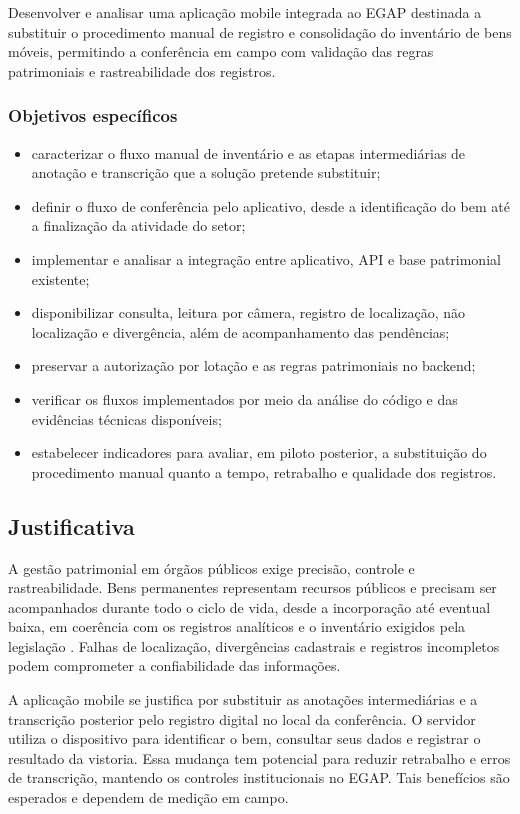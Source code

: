 \documentclass[12pt,a4paper]{article}
\begin{document}
Desenvolver e analisar uma aplicação mobile integrada ao EGAP destinada a substituir o procedimento manual de registro e consolidação do inventário de bens móveis, permitindo a conferência em campo com validação das regras patrimoniais e rastreabilidade dos registros.

\subsubsection{Objetivos específicos}

\begin{itemize}
    \item caracterizar o fluxo manual de inventário e as etapas intermediárias de anotação e transcrição que a solução pretende substituir;
    \item definir o fluxo de conferência pelo aplicativo, desde a identificação do bem até a finalização da atividade do setor;
    \item implementar e analisar a integração entre aplicativo, API e base patrimonial existente;
    \item disponibilizar consulta, leitura por câmera, registro de localização, não localização e divergência, além de acompanhamento das pendências;
    \item preservar a autorização por lotação e as regras patrimoniais no backend;
    \item verificar os fluxos implementados por meio da análise do código e das evidências técnicas disponíveis;
    \item estabelecer indicadores para avaliar, em piloto posterior, a substituição do procedimento manual quanto a tempo, retrabalho e qualidade dos registros.
\end{itemize}

\subsection{Justificativa}

A gestão patrimonial em órgãos públicos exige precisão, controle e rastreabilidade. Bens permanentes representam recursos públicos e precisam ser acompanhados durante todo o ciclo de vida, desde a incorporação até eventual baixa, em coerência com os registros analíticos e o inventário exigidos pela legislação \cite{brasil4320}. Falhas de localização, divergências cadastrais e registros incompletos podem comprometer a confiabilidade das informações.

A aplicação mobile se justifica por substituir as anotações intermediárias e a transcrição posterior pelo registro digital no local da conferência. O servidor utiliza o dispositivo para identificar o bem, consultar seus dados e registrar o resultado da vistoria. Essa mudança tem potencial para reduzir retrabalho e erros de transcrição, mantendo os controles institucionais no EGAP. Tais benefícios são esperados e dependem de medição em campo.
\end{document}
